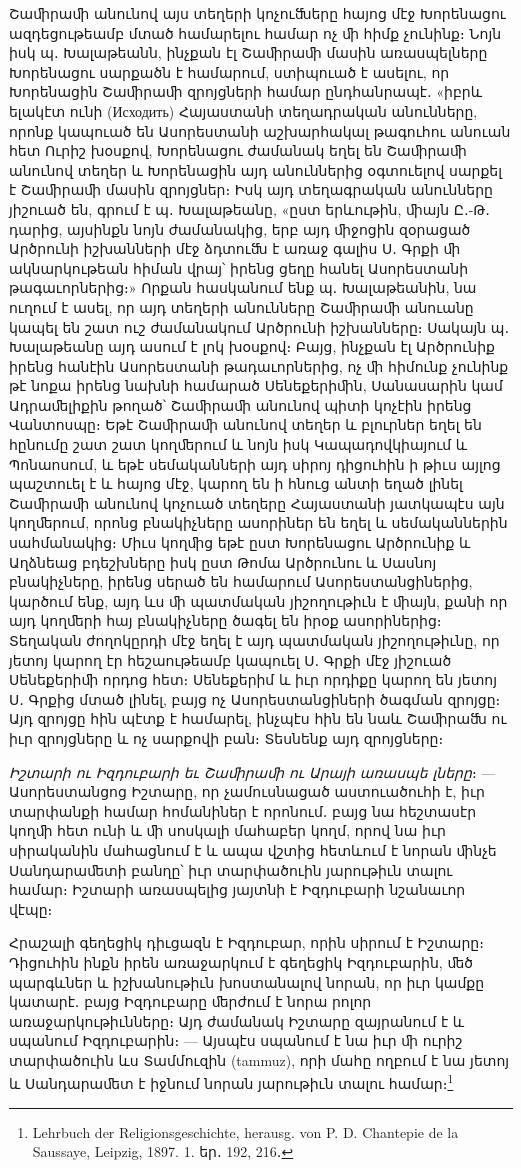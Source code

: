 \documentclass{article}
\begin{document}
{Շաﬕրաﬕ անունով այս տեղերի կոչուﬓերը հայոց մէջ Խորենացու ազդեցութեամբ մտած համարելու համար ոչ ﬕ հիմք չունինք։ Նոյն իսկ պ․ Խալաթեանն, ինչքան էլ Շաﬕրաﬕ մասին առասպելները Խորենացու սարքածն է համարում, ստիպուած է ասելու, որ Խորենացին Շաﬕրաﬕ զրոյցների համար ընդհանրապէ․ «իբրև ելակէտ ունի (Исходить) Հայաստանի տեղադրական անունները, որոնք կապուած են Ասորեստանի աշխարհակալ թագուհու անուան հետ Ուրիշ խօսքով, Խորենացու ժամանակ եղել են Շաﬕրաﬕ անունով տեղեր և Խորենացին այդ անուններից օգտուելով սարքել է Շաﬕրաﬕ մասին զրոյցներ։ Իսկ այդ տեղագրական անունները յիշուած են, գրում է պ․ Խալաթեանը, «ըստ երևութին, ﬕայն Ը․-Թ․ դարից, այսինքն նոյն ժամանակից, երբ այդ ﬕջոցին զօրացած Արծրունի իշխանների մէջ ձդտուﬓ է առաջ գալիս Ս․ Գրքի ﬕ ակնարկութեան հիման վրայ՝ իրենց ցեղը հանել Ասորեստանի թագաւորներից։» Որքան հասկանում ենք պ․ Խալաթեանին, նա ուղում է ասել, որ այդ տեղերի անունները Շաﬕրաﬕ անուանը կապել են շատ ուշ ժամանակում Արծրունի իշխանները։ Սակայն պ․ Խալաթեանը այդ ասում է լոկ խօսքով։ Բայց, ինչքան էլ Արծրունիք իրենց հանէին Ասորեստանի թադաւորներից, ոչ ﬕ հիմունք չունինք թէ նոքա իրենց նախնի համարած Սենեքերիﬕն, Սանասարին կամ Ադրաﬔլիքին թողած՝ Շաﬕրաﬕ անունով պիտի կոչէին իրենց Վանտոսպը։ Եթէ Շաﬕրաﬕ անունով տեղեր և բլուրներ եղել են հընումը շատ շատ կողﬔրում և նոյն իսկ Կապադովկիայում և Պոնաոսում, և եթէ սեմականների այդ սիրոյ դիցուհին ի թիւս այլոց պաշտուել է և հայոց մէջ, կարող են ի հնուց անտի եղած լինել Շաﬕրաﬕ անունով կոչուած տեղերը Հայաստանի յատկապէս այն կողﬔրում, որոնց բնակիչները ասորիներ են եղել և սեմականներին սահմանակից։ Միւս կողﬕց եթէ ըստ Խորենացու Արծրունիք և Աղձնեաց բդեշխները իսկ ըստ Թոմա Արծրունու և Սասնոյ բնակիչները, իրենց սերած են համարում Ասորեստանցիներից, կարծում ենք, այդ ևս ﬕ պատմական յիշողութիւն է ﬕայն, քանի որ այդ կողﬔրի հայ բնակիչները ծագել են իրօք ասորիներից։ Տեղական ժողոկըրդի մէջ եղել է այդ պատմական յիշողութիւնը, որ յետոյ կարող էր հեշաութեամբ կապուել Ս․ Գրքի մէջ յիշուած Սենեքերիﬕ որդոց հետ։ Սենեքերիմ և իւր որդիքը կարող են յետոյ Ս․ Գրքից մտած լինել, բայց ոչ Ասորեստանցիների ծագման զրոյցը։ Այդ զրոյցը հին պէտք է համարել, ինչպէս հին են նաև Շաﬕրաﬓ ու իւր զրոյցները և ոչ սարքովի բան։ Տեսնենք այդ զրոյցները։

\emph{Իշտարի ու Իզդուբարի եւ Շաﬕրաﬕ ու Արայի առասպե լները}։ — Ասորեստանցոց Իշտարը, որ չամուսնացած աստուածուհի է, իւր տարփանքի համար հոմանիներ է որոնում․ բայց նա հեշտասէր կողﬕ հետ ունի և ﬕ սոսկալի մահաբեր կողմ, որով նա իւր սիրականին մահացնում է և ապա վշտից հետևում է նորան ﬕնչե Սանդարաﬔտի բանղը՝ իւր տարփածուին յարութիւն տալու համար։ Իշտարի առասպելից յայտնի է Իզդուբարի նշանաւոր վէպը։

Հրաշալի գեղեցիկ դիւցազն է Իզդուբար, որին սիրում է Իշտարը։ Դիցուհին ինքն իրեն առաջարկում է գեղեցիկ Իզդուբարին, ﬔծ պարգևներ և իշխանութիւն խոստանալով նորան, որ իւր կամքը կատարէ․ բայց Իզդուբարը ﬔրժում է նորա րոլոր առաջարկութիւնները։ Այդ ժամանակ Իշտարը զայրանում է և սպանում Իզդուբարին։ — Այսպէս սպանում է նա իւր ﬕ ուրիշ տարփածուին ևս Տամմուզին (tammuz), որի մահը ողբում է նա յետոյ և Սանդարաﬔտ է իջնում նորան յարութիւն տալու համար։\footnote{Lehrbuch der Religionsgeschichte, herausg. von P. D. Chantepie de la Saussaye, Leipzig, 1897. 1. եր․ 192, 216․}

}
\end{document}
